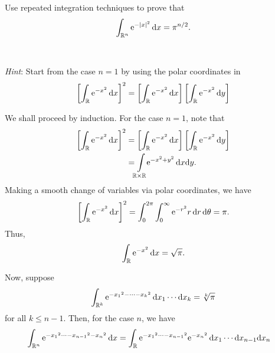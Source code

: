 \begin{problem}
  Use repeated integration techniques to prove that
  \[
    \int_{\mathbb{R}^n} \mathrm{e}^{-|x|^2}\mathop{}\!\mathrm{d} x=\pi^{n/2}.
  \]
  \\\\
  \emph{Hint}: Start from the case \(n=1\) by using the polar coordinates
  in
  \[
    \left[\int_{\bbR} \rme^{-x^2}\diff x\right]^2=%
    \left[\int_{\bbR} \rme^{-x^2}\diff x\right]%
    \left[\int_{\bbR} \rme^{-x^2}\diff y\right]%
  \]
\end{problem}
\begin{solution}
  We shall proceed by induction. For the case \(n=1\), note that
  \begin{align*}
    \left[\int_{\bbR} \rme^{-x^2}\diff x\right]^2
    &=\left[\int_{\bbR} \rme^{-x^2}\diff x\right]%
      \left[\int_{\bbR} \rme^{-x^2}\diff y\right]\\
    &=\int\limsclap{\bbR\times\bbR}\rme^{-x^2+y^2}\diff x\rmd y.
  \end{align*}
  Making a smooth change of variables via polar coordinates, we have
  \[
    \left[\int_{\mathbb{R}} \mathrm{e}^{-x^2}\mathop{}\!\mathrm{d} x\right]^2
    =\int_0^{2\pi}\int_0^\infty\mathrm{e}^{-r^2}r\mathop{}\!\mathrm{d} r\mathop{}\!\mathrm{d}\theta=\pi.
  \]
  Thus,
  \[
    \int_{\mathbb{R}}\mathrm{e}^{-x^2}\mathop{}\!\mathrm{d} x=\sqrt{\pi}.
  \]

  Now, suppose
  \[
    \int_{\bbR^k}\rme^{\cramped{-{x_1}^2-\dotsb-{x_k}^2}}\diff
    x_1\dotsm\rmd x_k=\sqrt[k]{\pi}
  \]
  for all \(k\leq n-1\). Then, for the case \(n\), we have
  \begin{align*}
    \int_{\bbR^n}\rme^{\cramped{-{x_1}^2\dotsb-{x_{n-1}}^2-{x_n}^2}}\diff x
    &=\int_{\bbR}\rme^{\cramped{-{x_1}^2\dotsb-{x_{n-1}}^2}}\rme^{\cramped{-{x_n}^2}}\diff
      x_1\dotsm\rmd x_{n-1}\rmd x_n
  \end{align*}
\end{solution}

